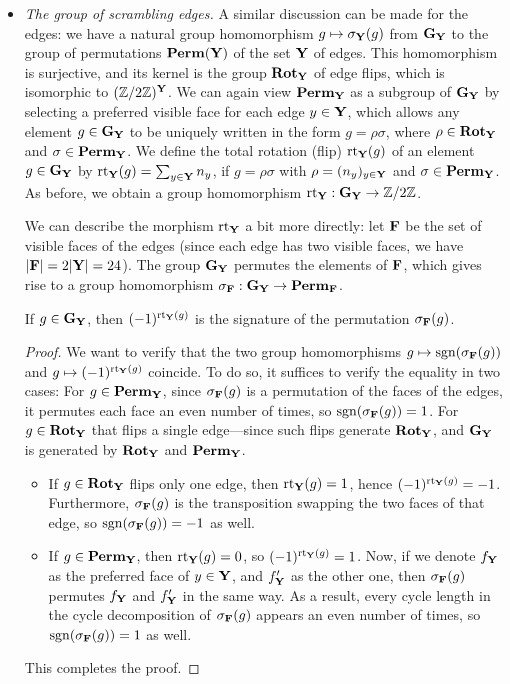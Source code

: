 \begin{itemize}
    \item \emph{The group of scrambling edges.} A similar discussion can be made for the edges:
    we have a natural group homomorphism
    $g \mapsto \sigma_{\mathbf{Y}}(g)$ from $\mathbf{G}_{\mathbf{Y}}$ to the group of permutations $\mathbf{Perm}(\mathbf{Y})$ of the set $\mathbf{Y}$ of edges.
    This homomorphism is surjective, and its kernel is the group $\mathbf{Rot}_{\mathbf{Y}}$ of edge flips, which is isomorphic to $(\mathbb{Z}/2\mathbb{Z})^{\mathbf{Y}}$.
    We can again view $\mathbf{Perm}_{\mathbf{Y}}$ as a subgroup of $\mathbf{G}_{\mathbf{Y}}$ by selecting a preferred visible face for each edge $y \in \mathbf{Y}$, which allows any element $g \in \mathbf{G}_{\mathbf{Y}}$ to be uniquely written in the form
    $g = \rho \sigma$, where $\rho \in \mathbf{Rot}_{\mathbf{Y}}$ and $\sigma \in \mathbf{Perm}_{\mathbf{Y}}$.
    We define the total rotation (flip) $\mathrm{rt}_{\mathbf{Y}}(g)$ of an element $g \in \mathbf{G}_{\mathbf{Y}}$ by
    $\mathrm{rt}_{\mathbf{Y}}(g) = \sum_{y \in \mathbf{Y}} n_{y}$, if $g = \rho \sigma$ with $\rho = (n_{y})_{y \in \mathbf{Y}}$ and $\sigma \in \mathbf{Perm}_{\mathbf{Y}}$.
    As before, we obtain a group homomorphism $\mathrm{rt}_{\mathbf{Y}} : \mathbf{G}_{\mathbf{Y}} \to \mathbb{Z} / 2 \mathbb{Z}$.

    We can describe the morphism $\mathrm{rt}_{\mathbf{Y}}$ a bit more directly: let $\mathbf{F}$ be the set of visible faces of the edges (since each edge has two visible faces, we have $|\mathbf{F}| = 2|\mathbf{Y}| = 24$). The group $\mathbf{G}_{\mathbf{Y}}$ permutes the elements of $\mathbf{F}$, which gives rise to a group homomorphism
    $\sigma_{\mathbf{F}} : \mathbf{G}_{\mathbf{Y}} \to \mathbf{Perm}_{\mathbf{F}}$.

    \begin{proposition}
        If $g \in \mathbf{G}_{\mathbf{Y}}$, then $(-1)^{\mathrm{rt}_{\mathbf{Y}}(g)}$ is the signature of the permutation $\sigma_{\mathbf{F}}(g)$.
    \end{proposition}
    \begin{proof}
        We want to verify that the two group homomorphisms
    $g \mapsto \mathrm{sgn}(\sigma_{\mathbf{F}}(g))$ and $g \mapsto (-1)^{\mathrm{rt}_{\mathbf{Y}}(g)}$ coincide.
    To do so, it suffices to verify the equality in two cases:
    For $g \in \mathbf{Perm}_{\mathbf{Y}}$, since $\sigma_{\mathbf{F}}(g)$ is a permutation of the faces of the edges, it permutes each face an even number of times, so $\mathrm{sgn}(\sigma_{\mathbf{F}}(g)) = 1$.
    For $g \in \mathbf{Rot}_{\mathbf{Y}}$ that flips a single edge—since such flips generate $\mathbf{Rot}_{\mathbf{Y}}$, and $\mathbf{G}_{\mathbf{Y}}$ is generated by $\mathbf{Rot}_{\mathbf{Y}}$ and $\mathbf{Perm}_{\mathbf{Y}}$.

    \begin{itemize}
        \item If $g \in \mathbf{Rot}_{\mathbf{Y}}$ flips only one edge, then $\mathrm{rt}_{\mathbf{Y}}(g) = 1$, hence $(-1)^{\mathrm{rt}_{\mathbf{Y}}(g)} = -1$. Furthermore, $\sigma_{\mathbf{F}}(g)$ is the transposition swapping the two faces of that edge, so $\mathrm{sgn}(\sigma_{\mathbf{F}}(g)) = -1$ as well.
        \item If $g \in \mathbf{Perm}_{\mathbf{Y}}$, then $\mathrm{rt}_{\mathbf{Y}}(g) = 0$, so $(-1)^{\mathrm{rt}_{\mathbf{Y}}(g)} = 1$.
        Now, if we denote $f_{\mathbf{Y}}$ as the preferred face of $y \in \mathbf{Y}$, and $f'_{\mathbf{Y}}$ as the other one, then $\sigma_{\mathbf{F}}(g)$ permutes $f_{\mathbf{Y}}$ and $f'_{\mathbf{Y}}$ in the same way.
        As a result, every cycle length in the cycle decomposition of $\sigma_{\mathbf{F}}(g)$ appears an even number of times, so $\mathrm{sgn}(\sigma_{\mathbf{F}}(g)) = 1$ as well.
    \end{itemize}
    This completes the proof.
    \end{proof}



\end{itemize}
